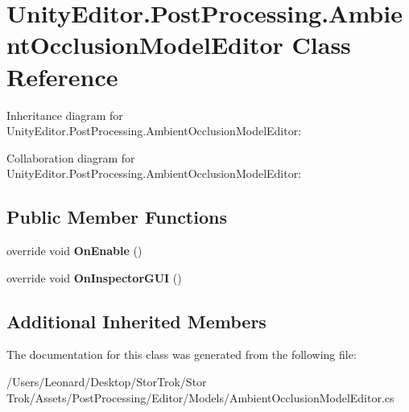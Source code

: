 \hypertarget{class_unity_editor_1_1_post_processing_1_1_ambient_occlusion_model_editor}{}\section{Unity\+Editor.\+Post\+Processing.\+Ambient\+Occlusion\+Model\+Editor Class Reference}
\label{class_unity_editor_1_1_post_processing_1_1_ambient_occlusion_model_editor}


Inheritance diagram for Unity\+Editor.\+Post\+Processing.\+Ambient\+Occlusion\+Model\+Editor\+:


Collaboration diagram for Unity\+Editor.\+Post\+Processing.\+Ambient\+Occlusion\+Model\+Editor\+:
\subsection*{Public Member Functions}
\begin{DoxyCompactItemize}
\item 
\mbox{\label{class_unity_editor_1_1_post_processing_1_1_ambient_occlusion_model_editor_a7985bbb79187976b1e90cdb401800e2f}} 
override void {\bfseries On\+Enable} ()
\item 
\mbox{\label{class_unity_editor_1_1_post_processing_1_1_ambient_occlusion_model_editor_a088ca4292c297130b6d86b22357c1c41}} 
override void {\bfseries On\+Inspector\+G\+UI} ()
\end{DoxyCompactItemize}
\subsection*{Additional Inherited Members}


The documentation for this class was generated from the following file\+:\begin{DoxyCompactItemize}
\item 
/\+Users/\+Leonard/\+Desktop/\+Stor\+Trok/\+Stor Trok/\+Assets/\+Post\+Processing/\+Editor/\+Models/Ambient\+Occlusion\+Model\+Editor.\+cs\end{DoxyCompactItemize}
